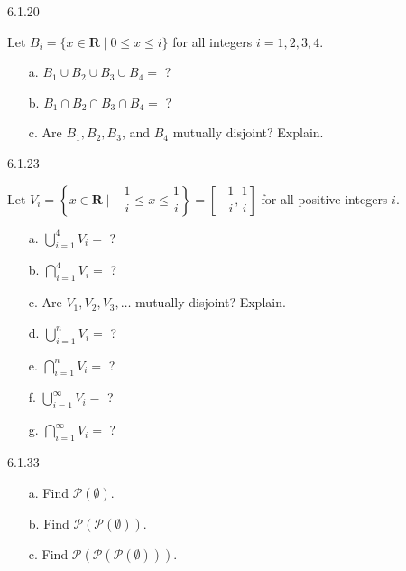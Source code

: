 \documentclass[11pt]{article}
\begin{document}
\begin{question}
    {6.1.20}
    {
        Let $B_i=\{x \in \mathbf{R} \mid 0 \leq x \leq i\}$ for all integers $i=1,2,3,4$.
        \vspace{-\baselineskip}
        \begin{enumerate}
            \item[a.] $B_1 \cup B_2 \cup B_3 \cup B_4=$ ?
            \item[b.] $B_1 \cap B_2 \cap B_3 \cap B_4=$ ?
            \item[c.] Are $B_1, B_2, B_3$, and $B_4$ mutually disjoint? Explain.
        \end{enumerate}
    }
\end{question}

\begin{question}
    {6.1.23}
    {
        Let $V_i=\left\{x \in \mathbf{R} \mid-\dfrac{1}{i} \leq x \leq \dfrac{1}{i}\right\}=\left[-\dfrac{1}{i}, \dfrac{1}{i}\right]$ for all positive integers $i$.
        \vspace{-\baselineskip}
        \begin{enumerate}
            \item[a.] $\bigcup_{i=1}^4 V_i=$ ?
            \item[b.] $\bigcap_{i=1}^4 V_i=$ ?
            \item[c.] Are $V_1, V_2, V_3, \ldots$ mutually disjoint? Explain.
            \item[d.] $\bigcup_{i=1}^n V_i=$ ?
            \item[e.] $\bigcap_{i=1}^n V_i=$ ?
            \item[f.] $\bigcup_{i=1}^{\infty} V_i=$ ?
            \item[g.] $\bigcap_{i=1}^{\infty} V_i=$ ?
        \end{enumerate}
    }
\end{question}

\begin{question}
    {6.1.33}
    {
        \vspace{-\baselineskip}
        \begin{enumerate}
            \item[a.] Find $\mathscr{P}(\emptyset)$.
            \item[b.] Find $\mathscr{P}(\mathscr{P}(\emptyset))$.
            \item[c.] Find $\mathscr{P}(\mathscr{P}(\mathscr{P}(\emptyset)))$.
        \end{enumerate}
    }
\end{question}
\end{document}
